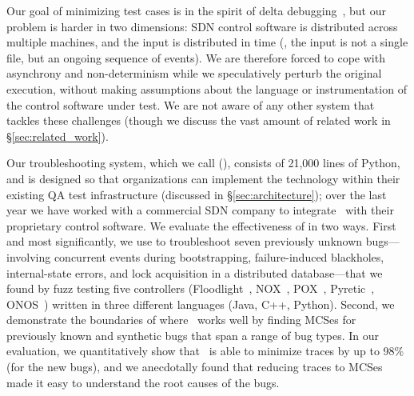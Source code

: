 Our goal of minimizing test cases is in the spirit of
delta debugging~\cite{Zeller:1999:YMP:318773.318946}, but our
problem is harder in two dimensions: SDN control software is distributed
across multiple machines, and the input is distributed in time (\ie, the
input is not a single file, but an ongoing sequence of events).
We are therefore forced to cope with asynchrony and non-determinism while
we speculatively perturb the original execution,
without making assumptions about the language
or instrumentation of the control software under test.
We are not aware of any other system that tackles these
challenges (though we discuss the vast amount of related work in \S\ref{sec:related_work}).

Our troubleshooting system, which we call {\projectname} ({\projectmeaning}),
consists of 21,000 lines of Python, and is designed so that organizations can
implement the technology within their existing QA test infrastructure (discussed in
\S\ref{sec:architecture}); over the last year we have worked with a
commercial SDN company to integrate \projectname~with their proprietary control
software. We evaluate the effectiveness of {\projectname} in
two ways. First and most significantly, we use {\projectname} to troubleshoot
seven previously unknown bugs---involving concurrent events during
bootstrapping, failure-induced blackholes, internal-state errors, and lock acquisition in a distributed database---that we found
by fuzz testing five controllers (Floodlight~\cite{floodlight}, NOX~\cite{nox},
POX~\cite{pox}, Pyretic~\cite{frenetic}, ONOS~\cite{ONOS})
written in three different languages (Java, C++, Python).
Second, we demonstrate the
boundaries of where \projectname~works well by
finding MCSes for previously known and synthetic bugs that span a range of bug
types. In our evaluation, we quantitatively show that \projectname~is able to
minimize traces by up to 98\% (for the new bugs), and we anecdotally found that reducing
traces to MCSes made it easy to understand the root causes of the bugs.
